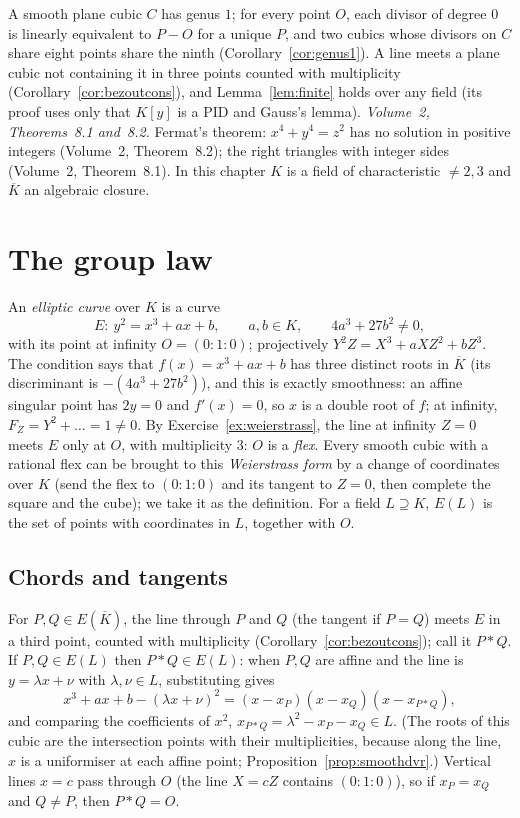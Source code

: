 \begin{reminder}
A smooth plane cubic $C$ has genus $1$; for every point $O$, each divisor of degree $0$ is linearly equivalent to $P-O$ for a unique $P$, and two cubics
whose divisors on $C$ share eight points share the ninth (Corollary~\ref{cor:genus1}). A line meets a plane cubic not containing it in three points
counted with multiplicity (Corollary~\ref{cor:bezoutcons}), and Lemma~\ref{lem:finite} holds over any field (its proof uses only that $K[y]$ is a
PID and Gauss's lemma). \emph{Volume~2, Theorems~8.1 and~8.2.} Fermat's theorem: $x^4+y^4=z^2$ has no solution in positive integers (Volume~2, Theorem~8.2); the right triangles
with integer sides (Volume~2, Theorem~8.1). In this chapter $K$ is a field of characteristic $\ne2,3$ and $\overline K$ an algebraic closure.
\end{reminder}

\section{The group law}

An \emph{elliptic curve} over $K$ is a curve
\[
E:\ y^2=x^3+ax+b,\qquad a,b\in K,\qquad 4a^3+27b^2\ne0,
\]
with its point at infinity $O=(0:1:0)$; projectively $Y^2Z=X^3+aXZ^2+bZ^3$. The condition says that $f(x)=x^3+ax+b$ has three distinct roots in
$\overline K$ (its discriminant is $-(4a^3+27b^2)$), and this is exactly smoothness: an affine singular point has $2y=0$ and $f'(x)=0$, so $x$ is a double
root of $f$; at infinity, $F_Z=Y^2+\dots=1\ne0$. By Exercise~\ref{ex:weierstrass}, the line at infinity $Z=0$ meets $E$ only at $O$, with multiplicity
$3$: $O$ is a \emph{flex}. Every smooth cubic with a rational flex can be brought to this \emph{Weierstrass form} by a change of coordinates over $K$
(send the flex to $(0:1:0)$ and its tangent to $Z=0$, then complete the square and the cube); we take it as the definition. For a field $L\supseteq K$,
$E(L)$ is the set of points with coordinates in $L$, together with $O$.

\subsection*{Chords and tangents}

For $P,Q\in E(\overline K)$, the line through $P$ and $Q$ (the tangent if $P=Q$) meets $E$ in a third point, counted with multiplicity
(Corollary~\ref{cor:bezoutcons}); call it $P*Q$. If $P,Q\in E(L)$ then $P*Q\in E(L)$: when $P,Q$ are affine and the line is $y=\lambda x+\nu$ with
$\lambda,\nu\in L$, substituting gives
\[
x^3+ax+b-(\lambda x+\nu)^2=(x-x_P)(x-x_Q)(x-x_{P*Q}),
\]
and comparing the coefficients of $x^2$, $x_{P*Q}=\lambda^2-x_P-x_Q\in L$. (The roots of this cubic are the intersection points with their
multiplicities, because along the line, $x$ is a uniformiser at each affine point; Proposition~\ref{prop:smoothdvr}.) Vertical lines $x=c$ pass through $O$
(the line $X=cZ$ contains $(0:1:0)$), so if $x_P=x_Q$ and $Q\ne P$, then $P*Q=O$.

